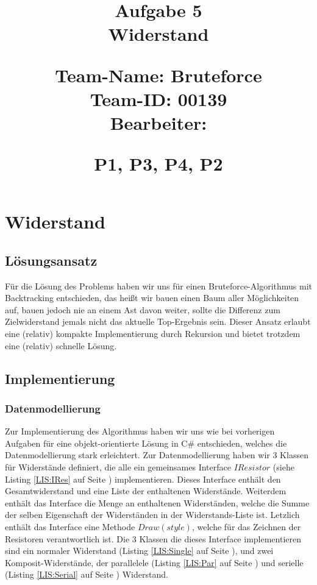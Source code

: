 \documentclass{article}
\begin{document}
\title{
{\Huge Aufgabe 5\\Widerstand}\\
\vspace{.5cm}
\begin{large}
Team-Name: Bruteforce\\
Team-ID: 00139\\
Bearbeiter:\\ 
\end{large}
\begin{normalsize}
P1,
P3,
P4,
P2
\end{normalsize}
}
\author{}
\date{}
\maketitle
\vspace{5cm}
\tableofcontents
\listoffigures
\lstlistoflistings
\newpage
\flushleft

\section{Widerstand}

\subsection{Lösungsansatz}
Für die Lösung des Problems haben wir uns für einen Bruteforce-Algorithmus mit Backtracking entschieden, das heißt wir bauen einen Baum aller Möglichkeiten auf, bauen jedoch nie an einem Ast davon weiter, sollte die Differenz zum Zielwiderstand jemals nicht das aktuelle Top-Ergebnis sein.
Dieser Ansatz erlaubt eine (relativ) kompakte Implementierung durch Rekursion und bietet trotzdem eine (relativ) schnelle Lösung.

\subsection{Implementierung}
\subsubsection{Datenmodellierung}
Zur Implementierung des Algorithmus haben wir uns wie bei vorherigen Aufgaben für eine objekt-orientierte Lösung in C\# entschieden, welches die Datenmodellierung stark erleichtert.
Zur Datenmodellierung haben wir 3 Klassen für Widerstände definiert, die alle ein gemeinsames Interface $IResistor$ (siehe Listing \ref{LIS:IRes} auf Seite \pageref{LIS:IRes}) implementieren. Dieses Interface enthält den Gesamtwiderstand und eine Liste der enthaltenen Widerstände. Weiterdem enthält das Interface die Menge an enthaltenen Widerständen, welche die Summe der selben Eigenschaft der Widerständen in der Widerstands-Liste ist. Letzlich enthält das Interface eine Methode $Draw(style)$, welche für das Zeichnen der Resistoren verantwortlich ist. Die 3 Klassen die dieses Interface implementieren sind ein normaler Widerstand (Listing \ref{LIS:Single} auf Seite \pageref{LIS:Single}),  und zwei Komposit-Widerstände, der parallelele (Listing \ref{LIS:Par} auf Seite \pageref{LIS:Par}) und serielle (Listing \ref{LIS:Serial} auf Seite \pageref{LIS:Serial}) Widerstand.
\end{document}
